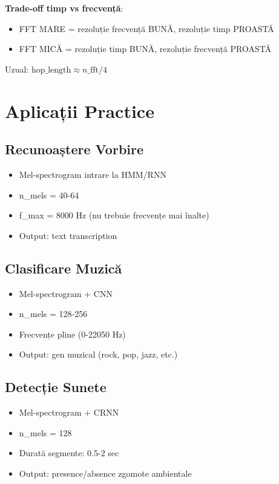\documentclass[12pt,a4paper,oneside]{book}
\newcommand{\warningbox}[1]{
\begin{tcolorbox}[colback=yellow!10,colframe=orange,title=\textbf{Atenție}]
#1
\end{tcolorbox}
}
\begin{document}
\warningbox{
\textbf{Trade-off timp vs frecvență}:
\begin{itemize}
    \item FFT MARE = rezoluție frecvență BUNĂ, rezoluție timp PROASTĂ
    \item FFT MICĂ = rezoluție timp BUNĂ, rezoluție frecvență PROASTĂ
\end{itemize}

Uzual: $\text{hop\_length} \approx n\_\text{fft} / 4$
}

\section{Aplicații Practice}

\subsection{Recunoaștere Vorbire}

\begin{itemize}
    \item Mel-spectrogram intrare la HMM/RNN
    \item n\_mels = 40-64
    \item f\_max = 8000 Hz (nu trebuie frecvențe mai înalte)
    \item Output: text transcription
\end{itemize}

\subsection{Clasificare Muzică}

\begin{itemize}
    \item Mel-spectrogram + CNN
    \item n\_mels = 128-256
    \item Frecvențe pline (0-22050 Hz)
    \item Output: gen muzical (rock, pop, jazz, etc.)
\end{itemize}

\subsection{Detecție Sunete}

\begin{itemize}
    \item Mel-spectrogram + CRNN
    \item n\_mels = 128
    \item Durată segmente: 0.5-2 sec
    \item Output: presence/absence zgomote ambientale
\end{itemize}
\end{document}
